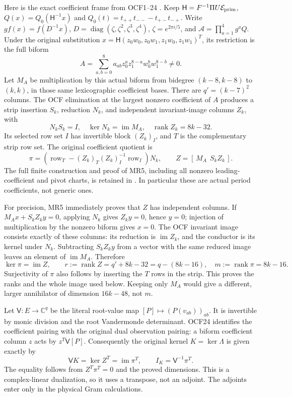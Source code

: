 \documentclass[11pt]{article}
\newcommand{\C}{\mathbb C}
\begin{document}
Here is the exact coefficient frame from OCF1--24 \cite{OCF}.
Keep $\mathsf H=F^{-1}\Pi U\mathcal E_{\rm prim}$,
$Q(x)=Q_0(\mathsf H^{-1}x)$ and
$Q_0(t)=t_{++}t_{--}-t_{+-}t_{-+}$.
Write $g f(x)=f(D^{-1}x)$,
$D=\operatorname{diag}(\zeta,\zeta^2,\zeta^3,\zeta^4)$,
$\zeta=e^{2\pi i/5}$, and $\mathcal A=\prod_{a=1}^4g^aQ$.
Under the original substitution
$x=\mathsf H(z_0w_0,z_0w_1,z_1w_0,z_1w_1)^T$, its restriction is the
full biform
\[
 A=\sum_{a,b=0}^8a_{ab}z_0^az_1^{8-a}w_0^bw_1^{8-b}\ne0.
 \tag{MR4}
\]
Let $M_A$ be multiplication by this actual biform from bidegree
$(k-8,k-8)$ to $(k,k)$, in those same lexicographic coefficient bases.
There are $q'=(k-7)^2$ columns. The OCF elimination at the largest
nonzero coefficient of $A$ produces a strip insertion $S_k$, reduction
$N_k$, and independent invariant-image columns $Z_k$, with
\[
 N_kS_k=I,\quad \ker N_k=\operatorname{im}M_A,\quad
 \operatorname{rank}Z_k=8k-32.\tag{MR5}
\]
Its selected row set $I$ has invertible block $(Z_k)_I$, and $T$ is
the complementary strip row set. The original coefficient quotient is
\[
 \pi=(\operatorname{row}_T-(Z_k)_T(Z_k)_I^{-1}
                   \operatorname{row}_I)N_k,
 \qquad Z=[\,M_A\ \ S_kZ_k\,].\tag{MR6}
\]
The full finite construction and proof of MR5, including all nonzero
leading-coefficient and pivot charts, is retained in \cite{OCF}.
In particular these are actual period coefficients, not generic ones.

For precision, MR5 immediately proves that $Z$ has independent columns.
If $M_Ax+S_kZ_ky=0$, applying $N_k$ gives $Z_ky=0$, hence $y=0$;
injection of multiplication by the nonzero biform gives $x=0$.
The OCF invariant image consists exactly of these columns: its reduction
is $\operatorname{im}Z_k$, and the conductor is its kernel under $N_k$.
Subtracting $S_kZ_ky$ from a vector with the same reduced image leaves
an element of $\operatorname{im}M_A$. Therefore
\[
 \ker\pi=\operatorname{im}Z,\qquad
 r:=\operatorname{rank}Z=q'+8k-32=q-(8k-16),
 \quad m:=\operatorname{rank}\pi=8k-16.\tag{MR7}
\]
Surjectivity of $\pi$ also follows by inserting the $T$ rows in the
strip. This proves the ranks and the whole image used below. Keeping
only $M_A$ would give a different, larger annihilator of dimension
$16k-48$, not $m$.

Let $\mathsf V:E\to\C^q$ be the literal root-value map
$[P]\mapsto(P(v_{ab}))_{ab}$. It is invertible by monic division
and the root Vandermonde determinant. OCF24 identifies the coefficient
pairing with the original dual observation pairing: a biform coefficient
column $z$ acts by $z^T\mathsf V[P]$. Consequently the original kernel
$K=\ker\Lambda$ is given exactly by
\[
 \mathsf V K=\ker Z^T=\operatorname{im}\pi^T,
 \qquad I_K=\mathsf V^{-1}\pi^T.\tag{MR8}
\]
The equality follows from $Z^T\pi^T=0$ and the proved dimensions.
This is a complex-linear dualization, so it uses a transpose, not an
adjoint. The adjoints enter only in the physical Gram calculations.
\end{document}

